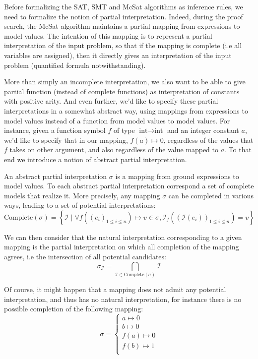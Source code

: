 \documentclass{article}
\begin{document}
Before formalizing the SAT, SMT and McSat algorithms as inference rules, we need to formalize the notion
of partial interpretation. Indeed, during the proof search, the McSat algorithm maintains a partial mapping from
expressions to model values. The intention of this mapping is to represent a partial interpretation of the input
problem, so that if the mapping is complete (i.e all variables are assigned), then it directly gives an interpretation
of the input problem (quantified formula notwithstanding).

More than simply an incomplete interpretation, we also want to be able to give partial function (instead of complete functions) as interpretation of
constants with positive arity. And even further, we'd like to specify these partial interpretations in a somewhat
abstract way, using mappings from expressions to model values instead of a function from model values to model
values. For instance, given a function symbol $f$ of type $\text{int} \rightarrow \text{int}$ and an integer constant $a$, we'd like to specify that in our mapping,
$f(a) \mapsto 0$, regardless of the values that $f$ takes on other argument, and also regardless
of the value mapped to $a$. To that end we introduce a notion of abstract partial interpretation.

An abstract partial interpretation $\sigma$ is a mapping from ground expressions to model values. To each abstract partial
interpretation correspond a set of complete models that realize it. More precisely, any mapping $\sigma$ can be completed
in various ways, leading to a set of potential interpretations:
\[
  \text{Complete}(\sigma) =
    \left\{
      \mathcal{I}
      \; | \;
      \forall f( {(e_i)}_{1 \leq i \leq n} ) \mapsto v \in \sigma ,
        \mathcal{I}_f ( {( \mathcal{I}(e_i) )}_{1 \leq i \leq n} ) = v
    \right\}
\]

We can then consider that the natural interpretation corresponding to a given mapping is the
partial interpretation on which all completion of the mapping agrees, i.e the intersection of
all potential candidates:
\[
  \sigma_\mathcal{I} = \bigcap_{ \mathcal{I} \in \text{Complete}(\sigma) } \mathcal{I}
\]

Of course, it might happen that a mapping does not admit any potential interpretation,
and thus has no natural interpretation, for instance there is no possible completion of the
following mapping:
\[
  \sigma = \left\{
    \begin{matrix}
      a \mapsto 0 \\
      b \mapsto 0 \\
      f(a) \mapsto 0 \\
      f(b) \mapsto 1 \\
    \end{matrix}
  \right.
\]
\end{document}
